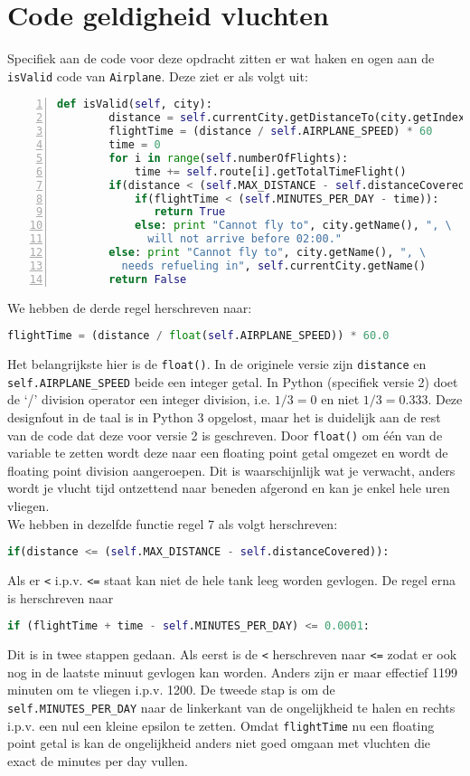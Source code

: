 \documentclass[a4paper]{article}
\begin{document}
\section{Code geldigheid vluchten}
Specifiek aan de code voor deze opdracht zitten er wat haken en ogen aan de \verb!isValid! code van \verb!Airplane!. Deze ziet er als volgt uit:

\begin{lstlisting}[language=Python, numbers=left] 
    def isValid(self, city):
        distance = self.currentCity.getDistanceTo(city.getIndex())
        flightTime = (distance / self.AIRPLANE_SPEED) * 60
        time = 0
        for i in range(self.numberOfFlights):
            time += self.route[i].getTotalTimeFlight()
        if(distance < (self.MAX_DISTANCE - self.distanceCovered)):
            if(flightTime < (self.MINUTES_PER_DAY - time)):
               return True
            else: print "Cannot fly to", city.getName(), ", \
              will not arrive before 02:00."
        else: print "Cannot fly to", city.getName(), ", \
          needs refueling in", self.currentCity.getName()
        return False
\end{lstlisting}
We hebben de derde regel herschreven naar:

\begin{lstlisting}[language=Python] 
        flightTime = (distance / float(self.AIRPLANE_SPEED)) * 60.0
\end{lstlisting}
Het belangrijkste hier is de \verb!float()!. In de originele versie zijn \verb!distance! en \verb!self.AIRPLANE_SPEED! beide een integer getal. In Python (specifiek versie 2) doet de `/' division operator een integer division, i.e. $1/3=0$ en niet $1/3=0.333$. Deze designfout in de taal is in Python 3 opgelost, maar het is duidelijk aan de rest van de code dat deze voor versie 2 is geschreven. Door \verb!float()! om \'e\'en van de variable te zetten wordt deze naar een floating point getal omgezet en wordt de floating point division aangeroepen. Dit is waarschijnlijk wat je verwacht, anders wordt je vlucht tijd ontzettend naar beneden afgerond en kan je enkel hele uren vliegen. \\
We hebben in dezelfde functie regel 7 als volgt herschreven:
\begin{lstlisting}[language=Python] 
if(distance <= (self.MAX_DISTANCE - self.distanceCovered)):
\end{lstlisting}
Als er \verb!<!  i.p.v. \verb!<=! staat kan niet de hele tank leeg worden gevlogen. De regel erna is herschreven naar 
\begin{lstlisting}[language=Python] 
if (flightTime + time - self.MINUTES_PER_DAY) <= 0.0001:
\end{lstlisting}
Dit is in twee stappen gedaan. Als eerst is de \verb!<! herschreven naar \verb!<=! zodat er ook nog in de laatste minuut gevlogen kan worden. Anders zijn er maar effectief 1199 minuten om te vliegen i.p.v. 1200. De tweede stap is om de \verb!self.MINUTES_PER_DAY! naar de linkerkant van de ongelijkheid te halen en rechts i.p.v. een nul een kleine epsilon te zetten. Omdat \verb!flightTime! nu een floating point getal is kan de ongelijkheid anders niet goed omgaan met vluchten die exact de minutes per day vullen. 
\end{document}

